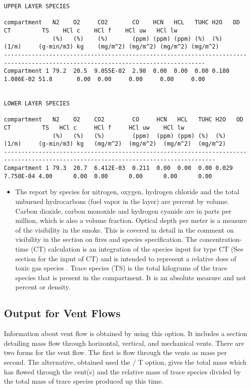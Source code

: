 \begin{lstlisting}[basicstyle=\tiny]
UPPER LAYER SPECIES

compartment   N2    O2     CO2       CO    HCN   HCL   TUHC H2O   OD        CT         TS    HCl c    HCl f    HCl uw   HCl lw
              (%)   (%)    (%)       (ppm) (ppm) (ppm) (%)  (%)   (1/m)     (g-min/m3) kg    (mg/m^2) (mg/m^2) (mg/m^2) (mg/m^2)
--------------------------------------------------------------------------------------------------------------------------------
Compartment 1 79.2  20.5  9.055E-02  2.98  0.00  0.00  0.00 0.180 1.086E-02 51.8       0.00  0.00     0.00     0.00     0.00


LOWER LAYER SPECIES

compartment   N2    O2    CO2        CO     HCN   HCL   TUHC H2O   OD        CT         TS   HCl c     HCl f     HCl uw    HCl lw
              (%)   (%)   (%)        (ppm)  (ppm) (ppm) (%)  (%)   (1/m)     (g-min/m3) kg   (mg/m^2)  (mg/m^2)  (mg/m^2)  (mg/m^2)
-----------------------------------------------------------------------------------------------------------------------------------
Compartment 1 79.3  20.7  6.412E-03  0.211  0.00  0.00  0.00 0.029 7.750E-04 4.00      0.00  0.00      0.00      0.00      0.00
\end{lstlisting}

\begin{itemize}
\item The report by species for nitrogen, oxygen, hydrogen chloride and the total unburned hydrocarbons (fuel vapor in the layer) are percent by volume. Carbon dioxide, carbon monoxide and hydrogen cyanide are in parts per million, which is also a volume fraction.  Optical depth per meter is a measure of the visibility in the smoke. This is covered in detail in the comment on visibility in the section on fires and species specification. The concentration-time (CT) calculation is an integration of the species input for type CT (See section  for the input of CT) and is intended to represent a relative dose of toxic gas species . Trace species (TS) is the total kilograms of the trace species that is present in the compartment. It is an absolute measure and not percent or density.
\end{itemize}

\subsection{Output for Vent Flows}

Information about vent flow is obtained by using this option.  It includes a section detailing mass flow through horizontal, vertical, and mechanical vents. There are two forms for the vent flow. The first is flow through the vents as mass per second. The alternative, obtained used the / T option, gives the total mass which has flowed through the vent(s) and the relative mass of trace species divided by the total mass of trace species produced up this time.

